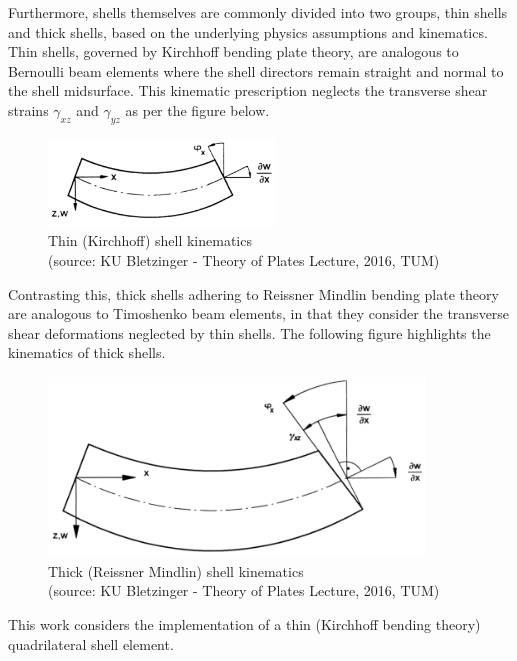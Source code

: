 Furthermore, shells themselves are commonly divided into two groups, thin shells and thick shells, based on the underlying physics assumptions and kinematics. \\

Thin shells, governed by Kirchhoff bending plate theory, are analogous to Bernoulli beam elements where the shell directors remain straight and normal to the shell midsurface. This kinematic prescription neglects the transverse shear strains $\gamma_{xz}$ and $\gamma_{yz}$ as per the figure below.

\begin{figure}[H]
	\centering
	\def\svgwidth{\columnwidth}
	\includegraphics[width=6cm]{images/bernoullie.png}
	\caption{Thin (Kirchhoff) shell kinematics \\ (source: KU Bletzinger - Theory of Plates Lecture, 2016, TUM)}
	\label{thinshellkine}
\end{figure}

Contrasting this, thick shells adhering to Reissner Mindlin bending plate theory are analogous to Timoshenko beam elements, in that they consider the transverse shear deformations neglected by thin shells. The following figure highlights the kinematics of thick shells.

\begin{figure}[H]
	\centering
	\def\svgwidth{\columnwidth}
	\includegraphics[width=10cm]{images/reissner.png}
	\caption{Thick (Reissner Mindlin) shell kinematics \\ (source: KU Bletzinger - Theory of Plates Lecture, 2016, TUM)}
	\label{thickshellkine}
\end{figure}

This work considers the implementation of a thin (Kirchhoff bending theory) quadrilateral shell element.

